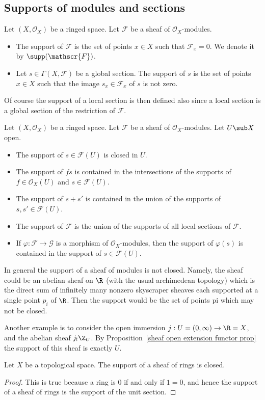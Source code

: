 \subsection{Supports of modules and sections}
\begin{definition}
Let $(X,\mathscr{O}_X)$ be a ringed space. Let $\mathscr{F}$ be a sheaf of $\mathscr{O}_X$-modules.
\begin{itemize}
\item The support of $\mathscr{F}$ is the set of points $x\in X$ such that $\mathscr{F}_x=0$. We denote it by $\supp(\mathscr{F})$.
\item Let $s\in\Gamma(X,\mathscr{F})$ be a global section. The support of $s$ is the set of points $x\in X$ such that the image $s_x\in\mathscr{F}_x$ of $s$ is not zero.
\end{itemize}
\end{definition}
Of course the support of a local section is then defined also since a local section is a global section of the restriction of $\mathscr{F}$.
\begin{lemma}
Let $(X,\mathscr{O}_X)$ be a ringed space. Let $\mathscr{F}$ be a sheaf of $\mathscr{O}_X$-modules. Let $U\sub X$ open.
\begin{itemize}
\item The support of $s\in\mathscr{F}(U)$ is closed in $U$.
\item The support of $fs$ is contained in the intersections of the supports of $f\in\mathscr{O}_X(U)$ and $s\in\mathscr{F}(U)$.
\item The support of $s+s'$ is contained in the union of the supports of $s,s'\in\mathscr{F}(U)$.
\item The support of $\mathscr{F}$ is the union of the supports of all local sections of $\mathscr{F}$.
\item If $\varphi:\mathscr{F}\to\mathscr{G}$ is a morphism of $\mathscr{O}_X$-modules, then the support of $\varphi(s)$ is contained in the support of $s\in\mathscr{F}(U)$. 
\end{itemize}
\end{lemma}
In general the support of a sheaf of modules is not closed. Namely, the sheaf could be an abelian sheaf on $\R$ (with the usual archimedean topology) which is the direct sum of infinitely many nonzero skyscraper sheaves each supported at a single point $p_i$ of $\R$. Then the support would be the set of points pi which may not be closed.\par
Another example is to consider the open immersion $j:U=(0,\infty)\to\R=X$,
and the abelian sheaf $j_!\Z_U$. By Proposition~\ref{sheaf open extension functor prop} the support of this sheaf is exactly $U$.
\begin{lemma}\label{sheaf ring supp closed}
Let $X$ be a topological space. The support of a sheaf of rings is closed.
\end{lemma}
\begin{proof}
This is true because a ring is $0$ if and only if $1=0$, and hence the support of a sheaf of rings is the support of the unit section.
\end{proof}
